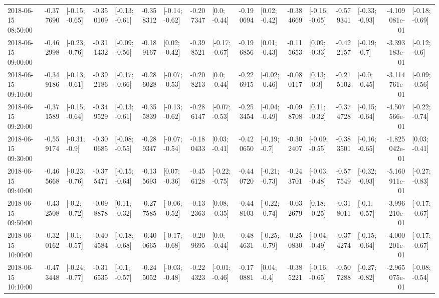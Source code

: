 \begin{tabular}{lrlrlrlrlrlrlrlrl}
2018-06-15 08:50:00 & -0.377690 &  [-0.15; -0.65] & -0.350109 &  [-0.13; -0.61] & -0.358312 &  [-0.14; -0.62] & -0.207347 &    [0.0; -0.44] & -0.190694 &   [0.02; -0.42] & -0.384669 &  [-0.16; -0.65] & -0.579341 &  [-0.33; -0.93] & -4.109081e-01 &  [-0.18; -0.69] \\
2018-06-15 09:00:00 & -0.462998 &  [-0.23; -0.76] & -0.311432 &  [-0.09; -0.56] & -0.189167 &   [0.02; -0.42] & -0.398521 &  [-0.17; -0.67] & -0.196856 &   [0.01; -0.43] & -0.115653 &   [0.09; -0.33] & -0.422157 &   [-0.19; -0.7] & -3.393183e-01 &   [-0.12; -0.6] \\
2018-06-15 09:10:00 & -0.349186 &  [-0.13; -0.61] & -0.392186 &  [-0.17; -0.66] & -0.286028 &  [-0.07; -0.53] & -0.208213 &    [0.0; -0.44] & -0.226915 &  [-0.02; -0.46] & -0.080117 &    [0.13; -0.3] & -0.215102 &   [-0.0; -0.45] & -3.114761e-01 &  [-0.09; -0.56] \\
2018-06-15 09:20:00 & -0.371589 &  [-0.15; -0.64] & -0.349529 &  [-0.13; -0.61] & -0.355839 &  [-0.13; -0.62] & -0.286147 &  [-0.07; -0.53] & -0.253454 &  [-0.04; -0.49] & -0.098708 &   [0.11; -0.32] & -0.374728 &  [-0.15; -0.64] & -4.507566e-01 &  [-0.22; -0.74] \\
2018-06-15 09:30:00 & -0.559174 &   [-0.31; -0.9] & -0.300685 &  [-0.08; -0.55] & -0.289347 &  [-0.07; -0.54] & -0.180433 &   [0.03; -0.41] & -0.420650 &   [-0.19; -0.7] & -0.302407 &  [-0.09; -0.55] & -0.383501 &  [-0.16; -0.65] & -1.825042e-01 &   [0.03; -0.41] \\
2018-06-15 09:40:00 & -0.465668 &  [-0.23; -0.76] & -0.375471 &  [-0.15; -0.64] & -0.135693 &   [0.07; -0.36] & -0.456128 &  [-0.22; -0.75] & -0.440720 &  [-0.21; -0.73] & -0.243701 &  [-0.03; -0.48] & -0.577549 &  [-0.32; -0.93] & -5.160911e-01 &  [-0.27; -0.83] \\
2018-06-15 09:50:00 & -0.432508 &   [-0.2; -0.72] & -0.098878 &   [0.11; -0.32] & -0.277585 &  [-0.06; -0.52] & -0.132363 &   [0.08; -0.35] & -0.448103 &  [-0.22; -0.74] & -0.032679 &   [0.18; -0.25] & -0.318011 &   [-0.1; -0.57] & -3.996210e-01 &  [-0.17; -0.67] \\
2018-06-15 10:00:00 & -0.320162 &   [-0.1; -0.57] & -0.404584 &  [-0.18; -0.68] & -0.400665 &  [-0.17; -0.68] & -0.209695 &    [0.0; -0.44] & -0.484631 &  [-0.25; -0.79] & -0.250830 &  [-0.04; -0.49] & -0.374274 &  [-0.15; -0.64] & -4.000201e-01 &  [-0.17; -0.67] \\
2018-06-15 10:10:00 & -0.473448 &  [-0.24; -0.77] & -0.316535 &   [-0.1; -0.57] & -0.245052 &  [-0.03; -0.48] & -0.224323 &  [-0.01; -0.46] & -0.170881 &    [0.04; -0.4] & -0.385221 &  [-0.16; -0.65] & -0.507288 &  [-0.27; -0.82] & -2.965075e-01 &  [-0.08; -0.54] \\

\end{tabular}
